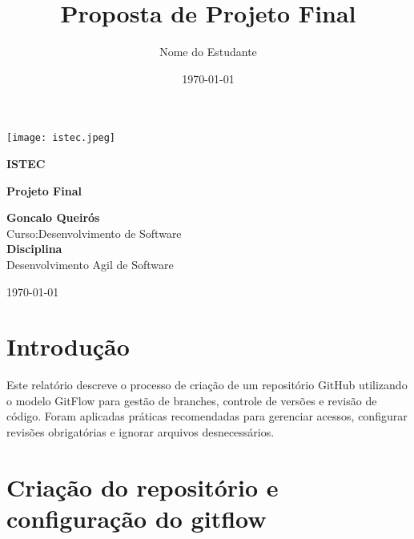 \documentclass[a4paper,12pt]{article}
\title{\textbf{Proposta de Projeto Final}}
\author{Nome do Estudante}
\date{\today}
\begin{document}
\begin{titlepage}
    \centering
    \texttt{[image: istec.jpeg]}
    \vspace{1cm}

    {\LARGE \textbf{ISTEC} \par}
    \vspace{1.5cm}

    {\Large \textbf{Projeto Final} \par}
    \vspace{0.5cm}

    \textbf{Goncalo Queirós} \\
    Curso:Desenvolvimento de Software \\

    \textbf{Disciplina} \\
    Desenvolvimento Agil de Software \\

    \vfill

    {\large \today\par}
\end{titlepage}

\newpage
\tableofcontents
\newpage

\section{Introdução}
Este relatório descreve o processo de criação de um repositório GitHub utilizando o modelo GitFlow para gestão de branches, controle de versões e revisão de código. Foram aplicadas práticas recomendadas para gerenciar acessos, configurar revisões obrigatórias e ignorar arquivos desnecessários.

\section{Criação do repositório e configuração do gitflow}


\end{document}

